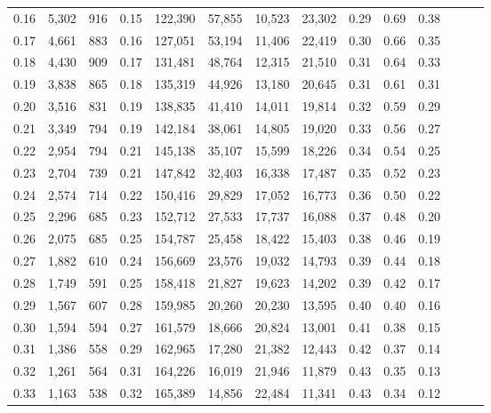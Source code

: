 \begin{tabular}{rrrrrrrrrrrrrr}
0.16 &   5,302 &    916 &  0.15 &  122,390 &   57,855 &  10,523 &  23,302 &  0.29 &  0.69 &      0.38 \\
0.17 &   4,661 &    883 &  0.16 &  127,051 &   53,194 &  11,406 &  22,419 &  0.30 &  0.66 &      0.35 \\
0.18 &   4,430 &    909 &  0.17 &  131,481 &   48,764 &  12,315 &  21,510 &  0.31 &  0.64 &      0.33 \\
0.19 &   3,838 &    865 &  0.18 &  135,319 &   44,926 &  13,180 &  20,645 &  0.31 &  0.61 &      0.31 \\
0.20 &   3,516 &    831 &  0.19 &  138,835 &   41,410 &  14,011 &  19,814 &  0.32 &  0.59 &      0.29 \\
0.21 &   3,349 &    794 &  0.19 &  142,184 &   38,061 &  14,805 &  19,020 &  0.33 &  0.56 &      0.27 \\
0.22 &   2,954 &    794 &  0.21 &  145,138 &   35,107 &  15,599 &  18,226 &  0.34 &  0.54 &      0.25 \\
0.23 &   2,704 &    739 &  0.21 &  147,842 &   32,403 &  16,338 &  17,487 &  0.35 &  0.52 &      0.23 \\
0.24 &   2,574 &    714 &  0.22 &  150,416 &   29,829 &  17,052 &  16,773 &  0.36 &  0.50 &      0.22 \\
0.25 &   2,296 &    685 &  0.23 &  152,712 &   27,533 &  17,737 &  16,088 &  0.37 &  0.48 &      0.20 \\
0.26 &   2,075 &    685 &  0.25 &  154,787 &   25,458 &  18,422 &  15,403 &  0.38 &  0.46 &      0.19 \\
0.27 &   1,882 &    610 &  0.24 &  156,669 &   23,576 &  19,032 &  14,793 &  0.39 &  0.44 &      0.18 \\
0.28 &   1,749 &    591 &  0.25 &  158,418 &   21,827 &  19,623 &  14,202 &  0.39 &  0.42 &      0.17 \\
0.29 &   1,567 &    607 &  0.28 &  159,985 &   20,260 &  20,230 &  13,595 &  0.40 &  0.40 &      0.16 \\
0.30 &   1,594 &    594 &  0.27 &  161,579 &   18,666 &  20,824 &  13,001 &  0.41 &  0.38 &      0.15 \\
0.31 &   1,386 &    558 &  0.29 &  162,965 &   17,280 &  21,382 &  12,443 &  0.42 &  0.37 &      0.14 \\
0.32 &   1,261 &    564 &  0.31 &  164,226 &   16,019 &  21,946 &  11,879 &  0.43 &  0.35 &      0.13 \\
0.33 &   1,163 &    538 &  0.32 &  165,389 &   14,856 &  22,484 &  11,341 &  0.43 &  0.34 &      0.12 \\

\end{tabular}
